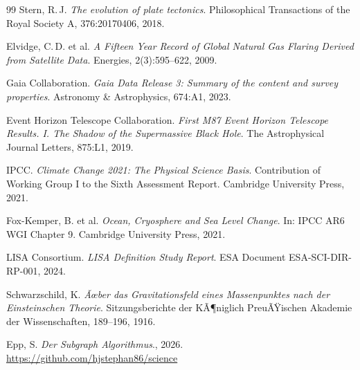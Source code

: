 ﻿\documentclass[a4paper,12pt]{article}
\theoremstyle{definition}
\begin{document}
\begin{thebibliography}{99}
Stern, R.\,J.
\textit{The evolution of plate tectonics}.
Philosophical Transactions of the Royal Society A, 376:20170406, 2018.

Elvidge, C.\,D. et al.
\textit{A Fifteen Year Record of Global Natural Gas Flaring Derived from
Satellite Data}.
Energies, 2(3):595--622, 2009.

Gaia Collaboration.
\textit{Gaia Data Release 3: Summary of the content and survey properties}.
Astronomy \& Astrophysics, 674:A1, 2023.

Event Horizon Telescope Collaboration.
\textit{First M87 Event Horizon Telescope Results. I. The Shadow of the
Supermassive Black Hole}.
The Astrophysical Journal Letters, 875:L1, 2019.

IPCC.
\textit{Climate Change 2021: The Physical Science Basis}.
Contribution of Working Group I to the Sixth Assessment Report.
Cambridge University Press, 2021.

Fox-Kemper, B. et al.
\textit{Ocean, Cryosphere and Sea Level Change}.
In: IPCC AR6 WGI Chapter 9. Cambridge University Press, 2021.

LISA Consortium.
\textit{LISA Definition Study Report}.
ESA Document ESA-SCI-DIR-RP-001, 2024.

Schwarzschild, K.
\textit{Ãœber das Gravitationsfeld eines Massenpunktes nach der
Einsteinschen Theorie}.
Sitzungsberichte der KÃ¶niglich PreuÃŸischen Akademie der Wissenschaften,
189--196, 1916.

Epp, S.
\textit{Der Subgraph Algorithmus}., 2026.
\url{https://github.com/hjstephan86/science}

\end{thebibliography}
\end{document}

